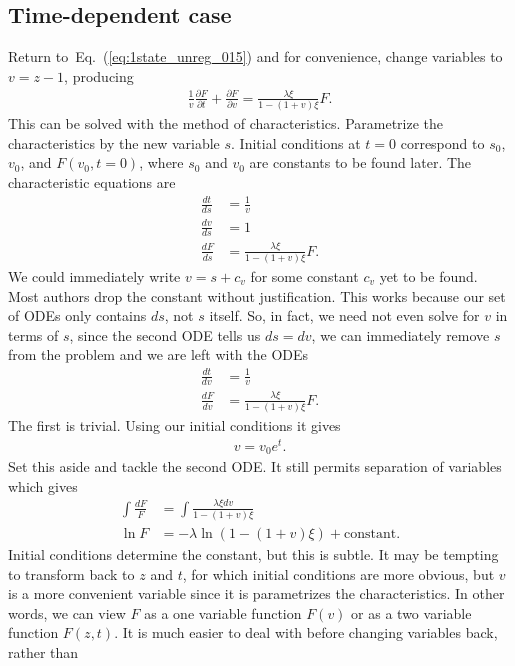 \documentclass[12pt]{article}%
\newcommand{\deriv}[2][{}]{\frac{d #1}{d #2}}
\newcommand{\pderiv}[2][{}]{\frac{\partial #1}{\partial #2}}
\newcommand{\eref}[1]{Eq.~(\ref{#1})}
\begin{document}
\subsection{Time-dependent case}
Return to~\eref{eq:1state_unreg_015} and for convenience,
change variables to $v=z-1$, producing
\begin{align}
\frac{1}{v}\pderiv[F]{t} + \pderiv[F]{v} = \frac{\lambda\xi}{1-(1+v)\xi} F.
\end{align}
This can be solved with the method of characteristics. Parametrize the
characteristics by the new variable $s$. Initial conditions at $t=0$
correspond to $s_0$, $v_0$, and $F(v_0,t=0)$, where $s_0$ and $v_0$ are
constants to be found later. The characteristic equations are
\begin{align}
\deriv[t]{s} &= \frac{1}{v}
\\
\deriv[v]{s} &= 1
\\
\deriv[F]{s} &= \frac{\lambda\xi}{1-(1+v)\xi} F.
\end{align}
We could immediately write $v=s+c_v$ for some constant $c_v$ yet to be
found. Most authors drop the constant without justification. This works
because our set of ODEs only contains $ds$, not $s$ itself. So, in fact,
we need not even solve for $v$ in terms of $s$, since the second ODE
tells us $ds=dv$, we can immediately remove $s$ from the problem and we
are left with the ODEs
\begin{align}
\deriv[t]{v} &= \frac{1}{v}
\\
\deriv[F]{v} &= \frac{\lambda\xi}{1-(1+v)\xi} F.
\end{align}
The first is trivial. Using our initial conditions it gives
\begin{align}
v = v_0 e^t.
\end{align}
Set this aside and tackle the second ODE.
It still permits separation of variables which gives
\begin{align}
\int \frac{dF}{F} &= \int \frac{\lambda \xi dv}{1 - (1+v)\xi}
\\
\ln F &= -\lambda \ln(1-(1+v)\xi) + \text{constant}.
\end{align}
Initial conditions determine the constant, but this is subtle. It may be
tempting to transform back to $z$ and $t$, for which initial conditions
are more obvious, but $v$ is a more convenient variable since it is
parametrizes the characteristics. In other words, we can view $F$ as a
one variable function $F(v)$ or as a two variable function $F(z,t)$. It
is much easier to deal with before changing variables back, rather than
\end{document}
